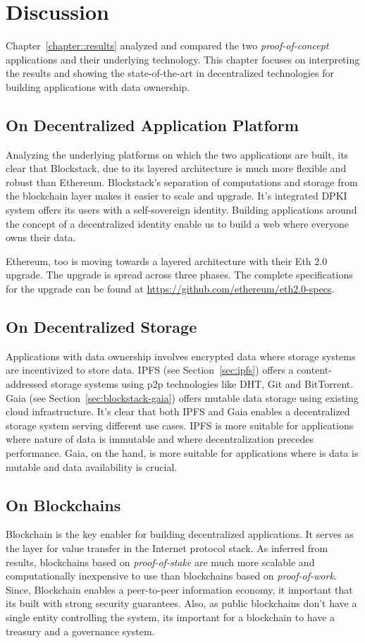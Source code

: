 \chapter{Discussion}\label{chapter::discussion}

	Chapter~\ref{chapter::results} analyzed and compared the two \textit{proof-of-concept} applications and their underlying technology. This chapter focuses on interpreting the results and showing the state-of-the-art in decentralized technologies for building applications with data ownership. 
	
	\section{On Decentralized Application Platform}
	Analyzing the underlying platforms on which the two applications are built, its clear that Blockstack, due to its layered architecture is much more flexible and robust than Ethereum. Blockstack's separation of computations and storage from the blockchain layer makes it easier to scale and upgrade. It's integrated DPKI system offers its users with a self-sovereign identity. Building applications around the concept of a decentralized identity enable us to build a web where everyone owns their data.
	
	Ethereum, too is moving towards a layered architecture with their Eth 2.0 upgrade. The upgrade is spread across three phases. The complete specifications for the upgrade can be found at \url{https://github.com/ethereum/eth2.0-specs}.
	
	\section{On Decentralized Storage}
	Applications with data ownership involves encrypted data where storage systems are incentivized to store data. IPFS (see Section~\ref{sec:ipfs}) offers a content-addressed storage systems using p2p technologies like DHT, Git and BitTorrent. Gaia (see Section~\ref{sec:blockstack-gaia}) offers mutable data storage using existing cloud infrastructure. It's clear that both IPFS and Gaia enables a decentralized storage system serving different use cases. IPFS is more suitable for applications where nature of data is immutable and where decentralization precedes performance. Gaia, on the hand, is more suitable for applications where is data is mutable and data availability is crucial.
	
	\section{On Blockchains}
	Blockchain is the key enabler for building decentralized applications. It serves as the layer for value transfer in the Internet protocol stack. As inferred from results, blockchains based on \textit{proof-of-stake} are much more scalable and computationally inexpensive to use than blockchains based on \textit{proof-of-work}. Since, Blockchain enables a peer-to-peer information economy, it important that its built with strong security guarantees. Also, as public blockchains don't have a single entity controlling the system, its important for a blockchain to have a treasury and a governance system.
	